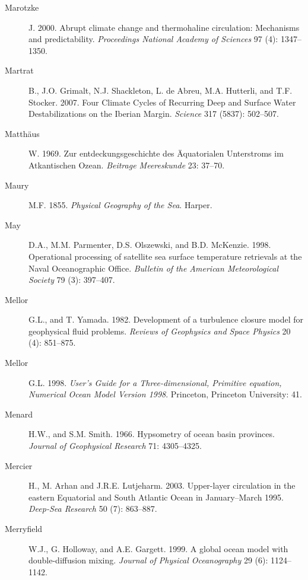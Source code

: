 \begin{description}
\item [Marotzke]J. 2000. Abrupt climate change and thermohaline
  circulation: Mechanisms and predictability. \textit{Proceedings
    National Academy of Sciences} 97 (4): 1347--1350.

\item [Martrat]B., J.O. Grimalt, N.J. Shackleton, L. de Abreu,
  M.A. Hutterli, and T.F. Stocker. 2007. Four Climate Cycles of
  Recurring Deep and Surface Water Destabilizations on the Iberian
  Margin. \textit{Science} 317 (5837): 502--507.

\item[Matth\"{a}us]W. 1969. Zur entdeckungsgeschichte des
  \"{A}quatorialen Unterstroms im Atkantischen Ozean. \textit{Beitrage
    Meereskunde} 23: 37--70.

\item [Maury]M.F. 1855. \textit{Physical Geography of the Sea}.
  Harper.

\item[May]D.A., M.M. Parmenter, D.S. Olszewski, and
  B.D. McKenzie. 1998.  Operational processing of satellite sea
  surface temperature retrievals at the Naval Oceanographic
  Office. \textit{Bulletin of the American Meteorological Society} 79
  (3): 397--407.

\item [Mellor]G.L., and T. Yamada. 1982. Development of a turbulence
  closure model for geophysical fluid problems. \textit{Reviews of
    Geophysics and Space Physics} 20 (4): 851--875.

\item [Mellor]G.L. 1998. \textit{User's Guide for a Three-dimensional,
  Primitive equation, Numerical Ocean Model Version 1998}. Princeton,
  Princeton University: 41.
	
\item [Menard]H.W., and S.M. Smith. 1966. Hypsometry of ocean basin
  provinces.  \textit{Journal of Geophysical Research} 71: 4305--4325.

\item [Mercier]H., M. Arhan and J.R.E. Lutjeharm. 2003. Upper-layer
  circulation in the eastern Equatorial and South Atlantic Ocean in
  January--March 1995. \textit{Deep-Sea Research} 50 (7): 863--887.

\item [Merryfield]W.J., G. Holloway, and A.E. Gargett.  1999. A global
  ocean model with double-diffusion mixing. \textit{Journal of
    Physical Oceanography} 29 (6): 1124--1142.


\end{description}
